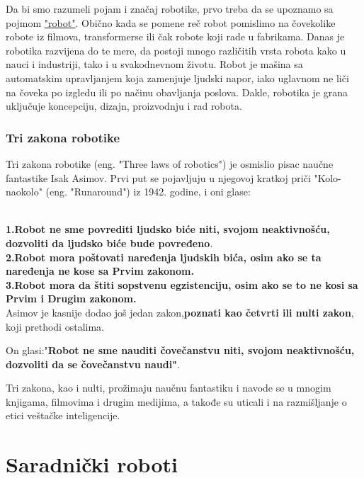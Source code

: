 \documentclass{report}
\begin{document}
Da bi smo razumeli pojam i značaj robotike, prvo treba da se upoznamo sa pojmom \href{https://www.sciencefriday.com/segments/the-origin-of-the-word-robot/}{"robot"}.
Obično kada se pomene reč robot pomislimo na čovekolike robote iz filmova, transformerse ili čak robote koji rade u fabrikama. Danas je robotika razvijena do te mere, da postoji mnogo različitih vrsta robota kako u nauci i industriji, tako i u svakodnevnom životu. Robot je mašina sa automatskim upravljanjem koja zamenjuje ljudski napor, iako uglavnom ne liči na čoveka po izgledu ili po načinu obavljanja poslova. Dakle, robotika je grana uključuje koncepciju, dizajn, proizvodnju i rad robota. \cite{robots in nowdays}

\subsection{Tri zakona robotike}
Tri zakona robotike (eng. "Three laws of robotics") je osmislio pisac naučne fantastike Isak Asimov. Prvi put se pojavljuju u njegovoj kratkoj priči "Kolo-naokolo" (eng. "Runaround") iz 1942. godine, i oni glase:\par
     \cite{three laws of robotics, runaround}\\
\textbf{1.Robot ne sme povrediti ljudsko biće niti, svojom neaktivnošću, dozvoliti da ljudsko biće bude povređeno}.\\

\textbf{2.Robot mora poštovati naređenja ljudskih bića, osim ako se ta naređenja ne kose sa Prvim zakonom.}\\

\textbf{3.Robot mora da štiti sopstvenu egzistenciju, osim ako se to ne kosi sa Prvim i Drugim zakonom.}\\

Asimov je kasnije dodao još jedan zakon,\textbf{poznati kao četvrti ili nulti zakon}, koji prethodi ostalima.\par

On glasi:"\textbf{Robot ne sme nauditi čovečanstvu niti, svojom neaktivnošću, dozvoliti da se čovečanstvu naudi"}.\par
Tri zakona, kao i nulti, prožimaju naučnu fantastiku i navode se u mnogim knjigama, filmovima i drugim medijima, a takođe su uticali i na razmišljanje o etici veštačke inteligencije.\cite{three laws of robotics}




\chapter{Saradnički roboti}
\end{document}
